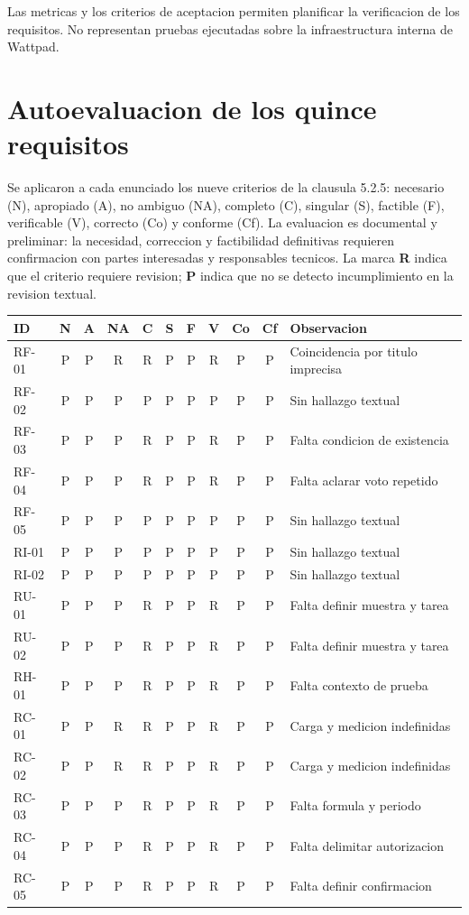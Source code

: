 \documentclass[11pt,a4paper]{article}
\begin{document}
Las metricas y los criterios de aceptacion
permiten planificar la verificacion de
los requisitos. No representan pruebas
ejecutadas sobre la infraestructura
interna de Wattpad.


\section{Autoevaluacion de los quince requisitos}

Se aplicaron a cada enunciado los nueve criterios de la clausula
5.2.5: necesario (N), apropiado (A), no ambiguo (NA), completo (C),
singular (S), factible (F), verificable (V), correcto (Co) y conforme
(Cf). La evaluacion es documental y preliminar: la necesidad,
correccion y factibilidad definitivas requieren confirmacion con
partes interesadas y responsables tecnicos. La marca \textbf{R}
indica que el criterio requiere revision; \textbf{P} indica que
no se detecto incumplimiento en la revision textual.

\begin{center}
\scriptsize
\setlength{\tabcolsep}{3pt}
\begin{tabular}{l*{9}{c}p{3.5cm}}
\toprule
ID & N&A&NA&C&S&F&V&Co&Cf& Observacion\\
\midrule
RF-01&P&P&R&R&P&P&R&P&P& Coincidencia por titulo imprecisa\\
RF-02&P&P&P&P&P&P&P&P&P& Sin hallazgo textual\\
RF-03&P&P&P&R&P&P&R&P&P& Falta condicion de existencia\\
RF-04&P&P&P&R&P&P&R&P&P& Falta aclarar voto repetido\\
RF-05&P&P&P&P&P&P&P&P&P& Sin hallazgo textual\\
RI-01&P&P&P&P&P&P&P&P&P& Sin hallazgo textual\\
RI-02&P&P&P&P&P&P&P&P&P& Sin hallazgo textual\\
RU-01&P&P&P&R&P&P&R&P&P& Falta definir muestra y tarea\\
RU-02&P&P&P&R&P&P&R&P&P& Falta definir muestra y tarea\\
RH-01&P&P&P&R&P&P&R&P&P& Falta contexto de prueba\\
RC-01&P&P&R&R&P&P&R&P&P& Carga y medicion indefinidas\\
RC-02&P&P&R&R&P&P&R&P&P& Carga y medicion indefinidas\\
RC-03&P&P&P&R&P&P&R&P&P& Falta formula y periodo\\
RC-04&P&P&P&R&P&P&R&P&P& Falta delimitar autorizacion\\
RC-05&P&P&P&R&P&P&R&P&P& Falta definir confirmacion\\
\bottomrule
\end{tabular}
\end{center}
\end{document}

